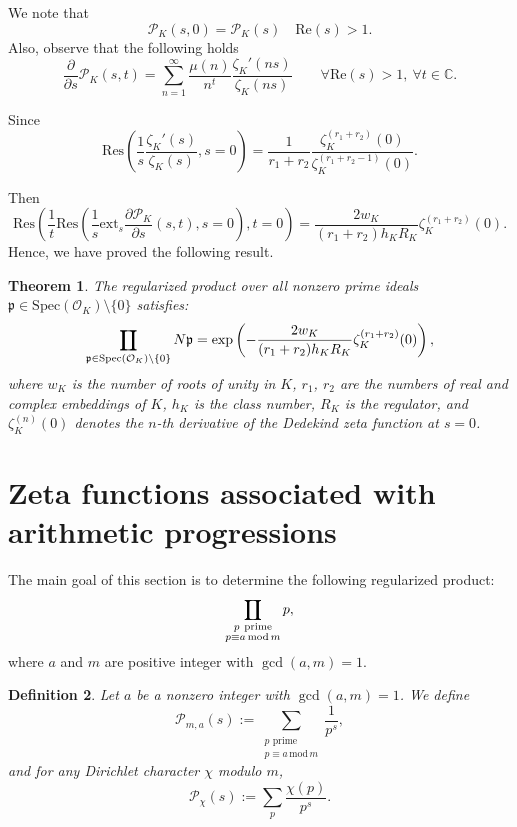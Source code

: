 \documentclass[12pt]{amsart}
\DeclareMathOperator*\Rprod{%
\mathchoice
  {\ooalign{$\displaystyle\prod$\cr\hidewidth$\displaystyle\coprod$\hidewidth\cr}}%
  {\ooalign{$\textstyle\prod$\cr\hidewidth$\textstyle\coprod$\hidewidth\cr}}%
  {\ooalign{$\scriptstyle\prod$\cr\hidewidth$\scriptstyle\coprod$\hidewidth\cr}}%
  {\ooalign{$\scriptscriptstyle\prod$\cr\hidewidth$%
  \scriptscriptstyle\coprod$\hidewidth\cr}}}
\newtheorem{theorem}{Theorem}[section]
\newtheorem{definition}[theorem]{Definition}%
\newcommand{\C}{\mathbb{C}}
\newcommand{\pt}{\partial}
\begin{document}
We note that
\[
\mathcal{P}_K(s,0)=\mathcal{P}_K(s)\quad \mathrm{Re}(s)>1.
\]
Also, observe that the following holds
\[
\frac{\pt}{\pt s} \mathcal{P}_K(s,t)=\sum_{n=1}^\infty \frac{\mu(n)}{n^{t}}\frac{\zeta_K'(ns)}{\zeta_K(ns)}\quad \quad \forall \mathrm{Re}(s)>1, \ \forall  t\in \C.
\]









Since
\[
\mathrm{Res}\left( {\frac{1}{s}} \frac{\zeta_K'(s)}{\zeta_K(s)},s=0\right)= \frac{1}{r_1+r_2} \frac{\zeta_K^{(r_1+r_2)}(0) }{\zeta_K^{(r_1+r_2-1)}(0)}.
\]



Then
\[
\mathrm{Res}\left(\frac{1}{t}\mathrm{Res}\left( \frac{1}{s}\mathrm{ext}_s\frac{\pt \mathcal P_K}{\pt s} (s,t),s=0\right), t=0\right)=\frac{2 w_K}{(r_1+r_2)h_K R_K} \zeta_K^{(r_1+r_2)}(0) .
\]
Hence, we have proved the following result.
\begin{theorem}\label{NF}
The regularized product over all nonzero prime ideals $\mathfrak{p} \in \mathrm{Spec}(\mathcal{O}_K) \setminus \{0\}$ satisfies:
\[
\Rprod_{\mathfrak{p} \in \mathrm{Spec}(\mathcal{O}_K) \setminus \{0\}} N\mathfrak{p} = \exp\left( -\frac{2 w_K}{(r_1 + r_2) h_K R_K}  \zeta_K^{(r_1 + r_2)}(0) \right),
\]
where
$w_K$ is the number of roots of unity in $K$, $r_1$, $r_2$ are the numbers of real and complex embeddings of $K$,
  $h_K$ is the class number,
  $R_K$ is the regulator, and 
  $\zeta_K^{(n)}(0)$ denotes the $n$-th derivative of the Dedekind zeta function at $s=0$.
\end{theorem}

 


\section{Zeta functions associated with  {arithmetic}  progressions}\label{ZPAP}


 
The main goal of this section is to determine the following regularized product:
\[
\Rprod_{\substack{p\ \text{prime} \\ p \equiv a\, \mathrm{mod}\, m}} p,
\]
 where $a$ and $m$ are positive integer with $\gcd(a,m)=1$.\\
 
 
\begin{definition}
Let $a$ be a nonzero integer with $\gcd(a, m) = 1$. We define
\[
\mathcal{P}_{m,a}(s) := \sum_{\substack{p \text{ prime} \\ p \equiv a\, \mathrm{mod}\, m}} \frac{1}{p^s},
\]
and for any Dirichlet character $\chi$ modulo $m$,
\[
\mathcal{P}_\chi(s) := \sum_{p} \frac{\chi(p)}{p^s}.
\]



\end{definition}
\end{document}
